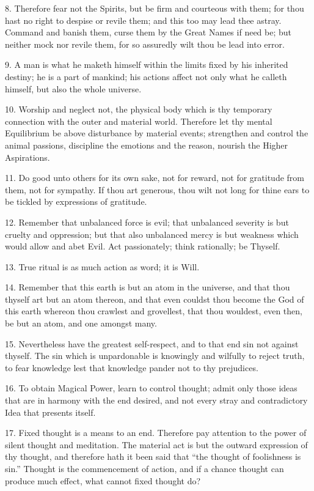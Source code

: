 8. Therefore fear not the Spirits, but be firm and courteous with them; for thou hast no right to despise or revile them; and this too may lead thee astray. Command and banish them, curse them by the Great Names if need be; but neither mock nor revile them, for so assuredly wilt thou be lead into error.

9. A man is what he maketh himself within the limits fixed by his inherited destiny; he is a part of mankind; his actions affect not only what he calleth himself, but also the whole universe.

10. Worship and neglect not, the physical body which is thy temporary connection with the outer and material world. Therefore let thy mental Equilibrium be above disturbance by material events; strengthen and control the animal passions, discipline the emotions and the reason, nourish the Higher Aspirations.

11. Do good unto others for its own sake, not for reward, not for gratitude from them, not for sympathy. If thou art generous, thou wilt not long for thine ears to be tickled by expressions of gratitude.

12. Remember that unbalanced force is evil; that unbalanced severity is but cruelty and oppression; but that also unbalanced mercy is but weakness which would allow and abet Evil. Act passionately; think rationally; be Thyself.

13. True ritual is as much action as word; it is Will.

14. Remember that this earth is but an atom in the universe, and that thou thyself art but an atom thereon, and that even couldst thou become the God of this earth whereon thou crawlest and grovellest, that thou wouldest, even then, be but an atom, and one amongst many.

15. Nevertheless have the greatest self-respect, and to that end sin not against thyself. The sin which is unpardonable is knowingly and wilfully to reject truth, to fear knowledge lest that knowledge pander not to thy prejudices.

16. To obtain Magical Power, learn to control thought; admit only those ideas that are in harmony with the end desired, and not every stray and contradictory Idea that presents itself.

17. Fixed thought is a means to an end. Therefore pay attention to the power of silent thought and meditation. The material act is but the outward expression of thy thought, and therefore hath it been said that \enquote{the thought of foolishness is sin.} Thought is the commencement of action, and if a chance thought can produce much effect, what cannot fixed thought do?

